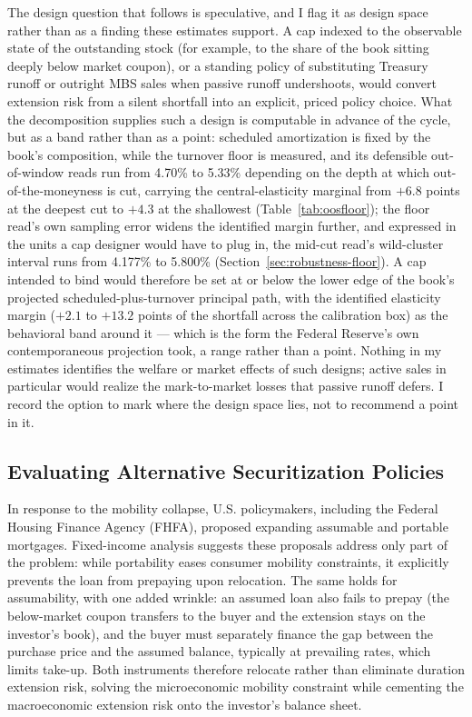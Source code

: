 \documentclass[12pt]{article}
\begin{document}
The design question that follows is speculative, and I flag it as design space rather than as a finding these estimates support. A cap indexed to the observable state of the outstanding stock (for example, to the share of the book sitting deeply below market coupon), or a standing policy of substituting Treasury runoff or outright MBS sales when passive runoff undershoots, would convert extension risk from a silent shortfall into an explicit, priced policy choice. What the decomposition supplies such a design is computable in advance of the cycle, but as a band rather than as a point: scheduled amortization is fixed by the book's composition, while the turnover floor is measured, and its defensible out-of-window reads run from 4.70\% to 5.33\% depending on the depth at which out-of-the-moneyness is cut, carrying the central-elasticity marginal from $+6.8$ points at the deepest cut to $+4.3$ at the shallowest (Table~\ref{tab:oosfloor}); the floor read's own sampling error widens the identified margin further, and expressed in the units a cap designer would have to plug in, the mid-cut read's wild-cluster interval runs from 4.177\% to 5.800\% (Section~\ref{sec:robustness-floor}). A cap intended to bind would therefore be set at or below the lower edge of the book's projected scheduled-plus-turnover principal path, with the identified elasticity margin ($+2.1$ to $+13.2$ points of the shortfall across the calibration box) as the behavioral band around it --- which is the form the Federal Reserve's own contemporaneous projection took, a range rather than a point. Nothing in my estimates identifies the welfare or market effects of such designs; active sales in particular would realize the mark-to-market losses that passive runoff defers. I record the option to mark where the design space lies, not to recommend a point in it.

\subsection{Evaluating Alternative Securitization Policies}\label{sec:discussion-policy}

In response to the mobility collapse, U.S. policymakers, including the Federal Housing Finance Agency (FHFA), proposed expanding assumable and portable mortgages. Fixed-income analysis suggests these proposals address only part of the problem: while portability eases consumer mobility constraints, it explicitly prevents the loan from prepaying upon relocation. The same holds for assumability, with one added wrinkle: an assumed loan also fails to prepay (the below-market coupon transfers to the buyer and the extension stays on the investor's book), and the buyer must separately finance the gap between the purchase price and the assumed balance, typically at prevailing rates, which limits take-up. Both instruments therefore relocate rather than eliminate duration extension risk, solving the microeconomic mobility constraint while cementing the macroeconomic extension risk onto the investor's balance sheet.
\end{document}

